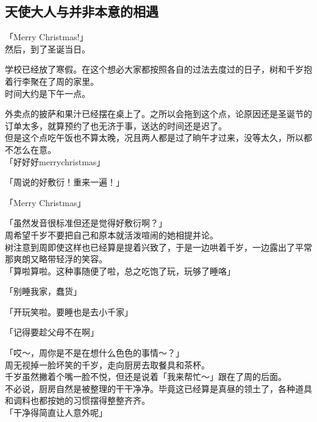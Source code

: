 \subsection{天使大人与并非本意的相遇}

「Merry Christmas!」\\

然后，到了圣诞当日。

学校已经放了寒假。在这个想必大家都按照各自的过法去度过的日子，树和千岁抱着行李聚在了周的家里。\\

时间大约是下午一点。

外卖点的披萨和果汁已经摆在桌上了。之所以会拖到这个点，论原因还是圣诞节的订单太多，就算预约了也无济于事，送达的时间还是迟了。\\

但是这个点吃午饭也不算太晚，况且两人都是过了晌午才过来，没等太久，所以都不怎么在意。\\

「好好好merrychristmas」

「周说的好敷衍！重来一遍！」

「Merry Christmas」

「虽然发音很标准但还是觉得好敷衍啊？」\\

周希望千岁不要把自己和原本就活泼喧闹的她相提并论。\\

树注意到周即使这样也已经算是提着兴致了，于是一边哄着千岁，一边露出了平常那爽朗又略带轻浮的笑容。\\

「算啦算啦。这种事随便了啦，总之吃饱了玩，玩够了睡咯」

「别睡我家，蠢货」

「开玩笑啦。要睡也是去小千家」

「记得要趁父母不在啊」

「哎～，周你是不是在想什么色色的事情～？」\\

周无视掉一脸坏笑的千岁，走向厨房去取餐具和茶杯。\\

千岁虽然撇着个嘴一脸不悦，但还是说着「我来帮忙～」跟在了周的后面。\\

不必说，厨房自然是被整理的干干净净。毕竟这已经算是真昼的领土了，各种道具和调料也都按她的习惯摆得整整齐齐。\\

「干净得简直让人意外呢」

